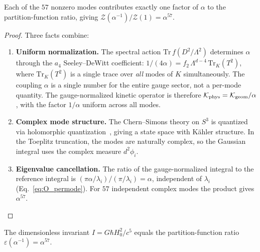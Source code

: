 \begin{lemma}\label{lem:O_gauge_norm}
Each of the $57$ nonzero modes contributes exactly one factor of $\alpha$ to the partition-function
ratio, giving $\mathcal{Z}(\alpha^{-1})/\mathcal{Z}(1) = \alpha^{57}$.
\end{lemma}

\begin{proof}
Three facts combine:
\begin{enumerate}
\item \textbf{Uniform normalization.}
The spectral action $\mathrm{Tr}\,f(D^2/\Lambda^2)$ determines $\alpha$ through the $a_4$
Seeley--DeWitt coefficient: $1/(4\alpha) = f_2\,\Lambda^{d-4}\,\mathrm{Tr}_K(T^2)$, where
$\mathrm{Tr}_K(T^2)$ is a single trace over \emph{all} modes of $K$ simultaneously.
The coupling $\alpha$ is a single number for the entire gauge sector, not a per-mode quantity.
The gauge-normalized kinetic operator is therefore $\mathcal{K}_{\rm phys} = \mathcal{K}_{\rm geom}/\alpha$,
with the factor $1/\alpha$ uniform across all modes.

\item \textbf{Complex mode structure.}
The Chern--Simons theory on $S^3$ is quantized via holomorphic quantization~\cite{Witten1989},
giving a state space with K\"ahler structure.  In the Toeplitz truncation, the modes are
naturally complex, so the Gaussian integral uses the complex measure $d^2\phi_i$.

\item \textbf{Eigenvalue cancellation.}
The ratio of the gauge-normalized integral to the reference integral is
$(\pi\alpha/\lambda_i)/(\pi/\lambda_i) = \alpha$, independent of $\lambda_i$
(Eq.~\ref{eq:O_permode}).  For $57$ independent complex modes the product gives $\alpha^{57}$.
\end{enumerate}
\end{proof}

\begin{lemma}\label{lem:O_hierarchy}
The dimensionless invariant $I = G\hbar H_0^2/c^5$ equals the partition-function ratio
$\varepsilon(\alpha^{-1}) = \alpha^{57}$.
\end{lemma}

